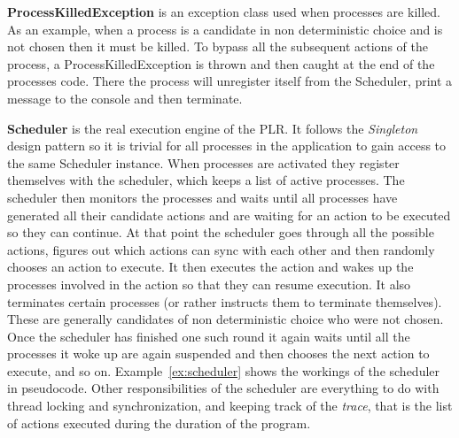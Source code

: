 	\textbf{ProcessKilledException} is an exception class used when processes
	are killed. As an example, when a process is a candidate in non deterministic
	choice and is not chosen then it must be killed. To bypass all the subsequent
	actions of the process, a \textsf{ProcessKilledException} is thrown and then
	caught at the end of the processes code. There the process will unregister
	itself from the \textsf{Scheduler}, print a message to the console and then
	terminate.
	
	\textbf{Scheduler} is the real execution engine of the PLR. It follows the
	\textit{Singleton}  design pattern so it is trivial for all
	processes in the application to gain access to the same \textsf{Scheduler}
	instance. When processes are activated they register themselves with the 
	scheduler, which keeps a list of active processes. The scheduler then monitors
	the processes and waits until all processes have generated all their candidate
	actions and are waiting for an action to be executed so they can continue.
	At that point the scheduler goes through all the possible actions, figures
	out which actions can sync with each other and then randomly chooses an
	action to execute. It then executes the action and wakes up the processes
	involved in the action so that they can resume execution. It also terminates
	certain processes (or rather instructs them to terminate themselves). These
	are generally candidates of non deterministic choice who were not chosen. 
	Once the scheduler has finished one such round it again waits until all 
	the processes it woke up are again suspended and then chooses the next
	action to execute, and so on. Example~\ref{ex:scheduler} shows the workings
	of the scheduler in pseudocode. Other responsibilities of the scheduler are
	everything to do with thread locking and synchronization, and keeping track of
	the \textit{trace}, that is the list of actions executed during the duration
	of the program.
	 

	

